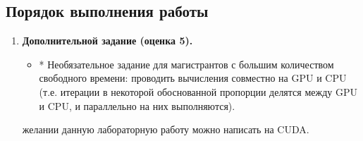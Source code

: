 \subsection{Порядок выполнения работы}

\begin{enumerate}
     необходимо реализовать один (для оценки 3) или два (для оценки 4) этапа вашей программы из предыдущих лабораторных работ. При этом вычисления можно проводить как на CPU, так и на GPU (на своё усмотрение, но GPU предпочтительнее).
    \item\textbf{Дополнительной задание (оценка 5).}
        \begin{itemize}
             заданий для оценки 3 и 4.
             доверительного интервала. 
             время 2 способами: с помощью profiling и с помощью обычного замера (как в предыдущих заданиях).
             накладные расходы, такие как доля времени, проводимого на каждом этапе вычисления («нормированная диаграмма с областями и накоплением»), число строк кода, добавленных при распараллеливании, а также грубая оценка времени, потраченного на распараллеливание (накладные расходы программиста), и т.п.
            \item* Необязательное задание для магистрантов с большим количеством свободного времени: проводить вычисления совместно на GPU и CPU (т.е. итерации в некоторой обоснованной пропорции делятся между GPU и CPU, и параллельно на них выполняются).
        \end{itemize}
     желании данную лабораторную работу можно написать на CUDA.
\end{enumerate}

